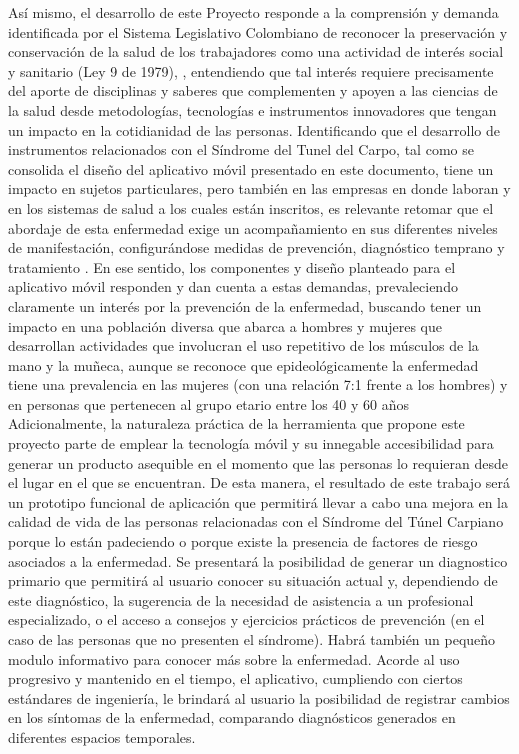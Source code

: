 \documentclass[a4paper,man,natbib]{apa6}
\begin{document}
Así mismo, el desarrollo de este Proyecto responde a la comprensión y demanda identificada por el Sistema Legislativo Colombiano de reconocer la preservación y conservación de la salud de los trabajadores como una actividad de interés social y sanitario (Ley 9 de 1979), \cite{v3}, entendiendo que tal interés requiere precisamente del aporte de disciplinas y saberes que complementen y apoyen a las ciencias de la salud desde metodologías, tecnologías e instrumentos innovadores que tengan un impacto en la cotidianidad de las personas. Identificando que el desarrollo de instrumentos relacionados con el Síndrome del Tunel del Carpo, tal como se consolida el diseño del aplicativo móvil presentado en este documento, tiene un impacto en sujetos particulares, pero también en las empresas en donde laboran y en los sistemas de salud a los cuales están inscritos,   es relevante retomar que el abordaje de esta enfermedad exige un acompañamiento en sus diferentes niveles de manifestación, configurándose medidas de prevención, diagnóstico temprano y tratamiento \cite{v3}. En ese sentido, los componentes y diseño planteado para el aplicativo móvil responden y dan cuenta a estas demandas, prevaleciendo claramente un interés por la prevención de la enfermedad, buscando tener un impacto en una población diversa que abarca a hombres y mujeres que desarrollan actividades que involucran el uso repetitivo de los músculos de la mano y la muñeca, aunque se reconoce que epideológicamente la enfermedad tiene una prevalencia en las mujeres (con una relación 7:1 frente a los hombres) y en personas que pertenecen al grupo etario entre los 40 y 60 años \cite{v1} Adicionalmente, la naturaleza práctica de la herramienta que propone este proyecto parte de emplear la tecnología móvil y su innegable accesibilidad para generar un producto asequible en el momento que las personas lo requieran desde el lugar en el que se encuentran. De esta manera, el resultado de este trabajo será un prototipo funcional de aplicación que permitirá llevar a cabo una mejora en la calidad de vida de las personas relacionadas con el Síndrome del Túnel Carpiano porque lo están padeciendo o porque existe la presencia de factores de riesgo asociados a la enfermedad. Se presentará la posibilidad de  generar un diagnostico primario que permitirá al usuario conocer su situación actual y, dependiendo de este diagnóstico, la sugerencia de la necesidad de asistencia a un profesional especializado,  o el acceso a consejos y ejercicios prácticos de prevención (en el caso de las personas que no presenten el síndrome). Habrá también un pequeño modulo informativo para conocer más sobre la enfermedad. Acorde al uso progresivo y mantenido en el tiempo, el aplicativo, cumpliendo con ciertos estándares de ingeniería, le brindará al usuario la posibilidad de registrar cambios en los síntomas de la enfermedad, comparando diagnósticos generados en diferentes espacios temporales. 
\end{document}
